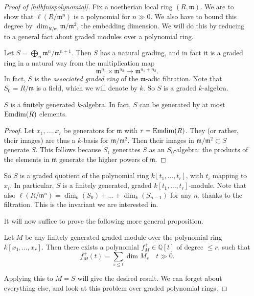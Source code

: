\begin{proof}[Proof of  \cref{hilbfnispolynomial}]
Fix a noetherian local ring $(R, \mathfrak{m})$. We are to show that
$\ell(R/\mathfrak{m}^n)$ is a polynomial for $n \gg 0$. We also have to bound
this degree by $\dim_{R/\mathfrak{m}} \mathfrak{m}/\mathfrak{m}^2$, the
embedding dimension. We will do this by reducing to a general fact about
graded modules over a polynomial ring.

Let $S = \bigoplus_n  \mathfrak{m}^n/\mathfrak{m}^{n+1}$. Then $S$ has a
natural grading, and in fact it is a graded ring in a natural way from the
multiplication map 
\[ \mathfrak{m}^{n_1} \times \mathfrak{m}^{n_2} \to \mathfrak{m}^{n_1 + n_2}.  \]
In fact, $S$ is the \emph{associated graded ring} of the $\mathfrak{m}$-adic filtration.
Note that $S_0 = R/\mathfrak{m}$ is a field, which we will denote by  $k$.
So $S$ is a graded $k$-algebra.

\begin{lemma} 
$S$ is a finitely generated $k$-algebra. In fact, $S$ can be generated by at
most $\operatorname{Emdim}(R)$ elements.
\end{lemma} 
\begin{proof} 
Let $x_1, \dots, x_r$ be generators for $\mathfrak{m} $ with $r = \operatorname{Emdim}(R)$.
They  (or rather, their images) are thus a $k$-basis
for $\mathfrak{m}/\mathfrak{m}^2$.
Then their images in $\mathfrak{m}/\mathfrak{m}^2 \subset S$ generate $S$.
This follows because $S_1$ generates $S$ as an $S_0$-algebra: the products of
the elements in $\mathfrak{m}$ generate the higher powers of $\mathfrak{m}$.
\end{proof} 

So $S$ is a graded quotient of the polynomial ring $k[t_1, \dots, t_r]$, with
$t_i $ mapping to $x_i$. In particular, $S$ is a finitely generated, graded $k[t_1,
\dots, t_r]$-module.
Note that also $\ell(R/\mathfrak{m}^n)  = \dim_{k}(S_0) + \dots +
\dim_{k}(S_{n-1})$ for any $n$, thanks to the filtration. This is the
invariant we are interested in.

It will now suffice to prove the following more general proposition.
\begin{proposition} \label{hilbfngeneral}
Let $M$ be any finitely generated graded module over the polynomial ring
$k[x_1, \dots, x_r]$. Then
there exists a polynomial $f_M^+ \in \mathbb{Q}[t]$ of degree $ \leq r$, such that
\[ f_M^+(t) = \sum_{s \leq t} \dim M_s \quad t \gg 0.   \]
\end{proposition} 
Applying this to $M = S$ will give the desired result. We can forget about
everything else, and look at this problem over graded polynomial rings.


\end{proof}
